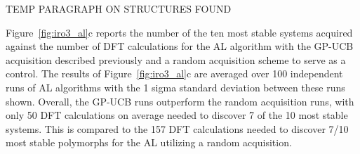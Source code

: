 %
TEMP PARAGRAPH ON STRUCTURES FOUND


%
Figure~\ref{fig:iro3_al}c reports the number of the ten most stable systems acquired against the number of DFT calculations for the AL algorithm with the GP-UCB acquisition described previously and a random acquisition scheme to serve as a control.
%
The results of Figure~\ref{fig:iro3_al}c are averaged over 100 independent runs of AL algorithms with the 1 sigma standard deviation between these runs shown.
%
Overall, the GP-UCB runs outperform the random acquisition runs, with only \num{50} DFT calculations on average needed to discover \num{7} of the \num{10} most stable systems.
%
This is compared to the \num{157} DFT calculations needed to discover \num{7/10} most stable polymorphs for the AL utilizing a random acquisition.



